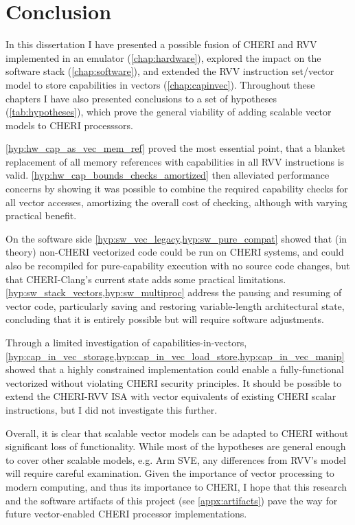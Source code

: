 \documentclass[../thesis]{subfiles}
\begin{document}
\pagebreak
\section{Conclusion}
In this dissertation I have presented a possible fusion of CHERI and RVV implemented in an emulator (\cref{chap:hardware}), explored the impact on the software stack (\cref{chap:software}), and extended the RVV instruction set/vector model to store capabilities in vectors (\cref{chap:capinvec}).
Throughout these chapters I have also presented conclusions to a set of hypotheses (\cref{tab:hypotheses}), which prove the general viability of adding scalable vector models to CHERI processsors.

\cref{hyp:hw_cap_as_vec_mem_ref} proved the most essential point, that a blanket replacement of all memory references with capabilities in all RVV instructions is valid.
\cref{hyp:hw_cap_bounds_checks_amortized} then alleviated performance concerns by showing it was possible to combine the required capability checks for all vector accesses, amortizing the overall cost of checking, although with varying practical benefit.

On the software side \cref{hyp:sw_vec_legacy,hyp:sw_pure_compat} showed that (in theory) non-CHERI vectorized code could be run on CHERI systems, and could also be recompiled for pure-capability execution with no source code changes, but that CHERI-Clang's current state adds some practical limitations.
\cref{hyp:sw_stack_vectors,hyp:sw_multiproc} address the pausing and resuming of vector code, particularly saving and restoring variable-length architectural state, concluding that it is entirely possible but will require software adjustments.

Through a limited investigation of capabilities-in-vectors, \cref{hyp:cap_in_vec_storage,hyp:cap_in_vec_load_store,hyp:cap_in_vec_manip} showed that a highly constrained implementation could enable a fully-functional vectorized  without violating CHERI security principles.
It should be possible to extend the CHERI-RVV ISA with vector equivalents of existing CHERI scalar instructions, but I did not investigate this further.

Overall, it is clear that scalable vector models can be adapted to CHERI without significant loss of functionality.
While most of the hypotheses are general enough to cover other scalable models, e.g. Arm SVE, any differences from RVV's model will require careful examination.
Given the importance of vector processing to modern computing, and thus its importance to CHERI, I hope that this research and the software artifacts of this project (see \cref{appx:artifacts}) pave the way for future vector-enabled CHERI processor implementations.
\end{document}
